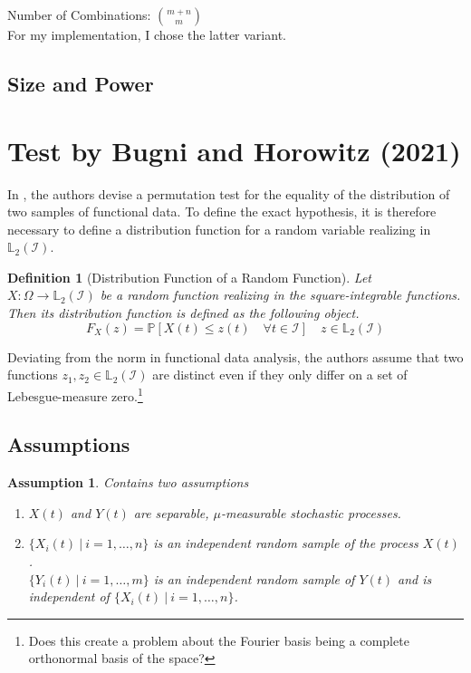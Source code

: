 \documentclass[12pt, a4paper]{article}
\theoremstyle{MAstyle} \newtheorem{assumption}{Assumption}[section]
\theoremstyle{MAstyle} \newtheorem{definition}{Definition}[section]
\theoremstyle{MAstyle} \newtheorem{theorem}{Theorem}[section]
\begin{document}
		 
			Number of Combinations: $\binom{m+n}{m}$\\
			
			For my implementation, I chose the latter variant.
	
		\subsection{Size and Power}
		
	\section{Test by Bugni and Horowitz (2021)}\label{Bugni_Horowitz_2021}
	
		In \cite{bugni_permutation_2021}, the authors devise a permutation test for the equality of the distribution of two samples of functional data. To define the exact hypothesis, it is therefore necessary to define a distribution function for a random variable realizing in $\mathbb{L}_2(\mathcal{I})$.
		\begin{definition}[Distribution Function of a Random Function]
			Let $X:\Omega \rightarrow \mathbb{L}_2(\mathcal{I})$ be a random function realizing in the square-integrable functions. Then its distribution function is defined as the following object.
			\begin{equation*}
				F_X(z) = \mathbb{P}\left[X(t) \leq z(t) \quad \forall t \in \mathcal{I}\right] \quad z \in \mathbb{L}_2(\mathcal{I})
			\end{equation*}
		\end{definition}
		Deviating from the norm in functional data analysis, the authors assume that two functions $z_1, z_2 \in \mathbb{L}_2(\mathcal{I})$ are distinct even if they only differ on a set of Lebesgue-measure zero.\footnote{Does this create a problem about the Fourier basis being a complete orthonormal basis of the space?}
		
		\subsection{Assumptions}
		
			\begin{assumption} Contains two assumptions
				\begin{enumerate}
					\item $X(t)$ and $Y(t)$ are separable, $\mu$-measurable stochastic processes.
					\item $\{X_i(t) \: \vert \: i = 1, \dots, n\}$ is an independent random sample of the process $X(t)$. \\
					$\{Y_i(t) \: \vert \: i = 1, \dots, m\}$ is an independent random sample of $Y(t)$ and is independent of $\{X_i(t) \: \vert \: i = 1, \dots, n\}$.
				\end{enumerate}
			\end{assumption}
		
\end{document}
